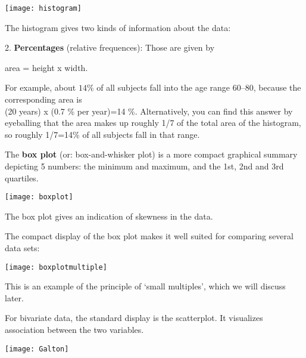 \documentclass{beamer}
\begin{document}
\begin{frame}
\begin{center}
\texttt{[image: histogram]}
\end{center}

The histogram gives two kinds of information about the data:\\
\smallskip

2. {\bf Percentages} (relative frequences): Those are given by\\
\begin{center}
 area = height x width.\\
\end{center}
For example, about $14\%$ of all subjects fall into the age range 60--80, because the
corresponding area is\\
 (20 years) x (0.7 \% per year)=14 \%. Alternatively, you can find
this answer by eyeballing that the area makes up roughly 1/7 of the total 
area of the histogram, so
roughly 1/7=14\% of all subjects fall in that range.
\end{frame}

\begin{frame}
The {\bf box plot} (or: box-and-whisker plot) is a more compact graphical
summary depicting 5 numbers: the minimum and maximum, and the 1st, 2nd
and 3rd quartiles. 
\medskip

\begin{center}
\texttt{[image: boxplot]}
\end{center}

The box plot gives an indication of skewness in the data.
\end{frame}

\begin{frame}
The compact display of the box plot makes it well suited for 
comparing several data sets:
\medskip

\begin{center}
\texttt{[image: boxplotmultiple]}
\end{center}

This is an example of the principle of `small multiples', 
which we will discuss later.
\end{frame}

\begin{frame}
For bivariate data, the standard display is the scatterplot. 
It visualizes association between the two variables.

\begin{center}
\texttt{[image: Galton]}
\end{center}

\end{frame}
\end{document}
